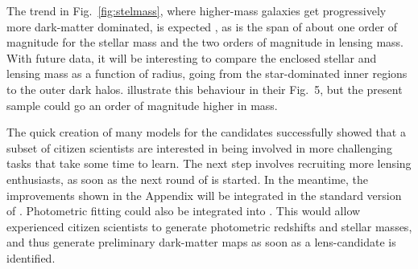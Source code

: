 The trend in Fig.~\ref{fig:stelmass}, where higher-mass galaxies get
progressively more dark-matter dominated, is expected
\citep[see, e.g.][]{2005ApJ...623L...5F}, as is the span of about one
order of magnitude for the stellar mass and the two orders of
magnitude in lensing mass. With future data, it will be interesting to
compare the enclosed stellar and lensing mass as a function of radius,
going from the star-dominated inner regions to the outer dark
halos. \citet{2011ApJ...740...97L} illustrate this behaviour in their
Fig.~5, but the present sample could go an order of magnitude higher
in mass.

The quick creation of many models for the {\SW} candidates
successfully showed that a subset of citizen scientists are interested
in being involved in more challenging tasks that take some time to
learn. The next step involves recruiting more lensing enthusiasts, as
soon as the next round of {\SW} is started. In the meantime, the
improvements shown in the Appendix will be integrated in the standard
version of {\SpL}. Photometric fitting could also be
integrated into {\SpL}. This would allow experienced citizen
scientists to generate photometric redshifts and stellar masses, and
thus generate preliminary dark-matter maps as soon as a lens-candidate
is identified.




